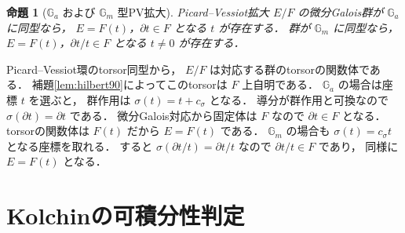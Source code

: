 \documentclass[a5paper,10pt,onecolumn]{jsarticle}
\makeatletter
\theoremstyle{mathnotetheorem}
\newtheorem{proposition}[theorem]{命題}
\renewcommand{\proofname}{証明}
\renewenvironment{proof}[1][\proofname]{%
  \par\pushQED{\qed}\normalfont\topsep4\p@\@plus2\p@\relax
  \trivlist\item[\hskip\labelsep\bfseries #1]\ignorespaces
}{\popQED\endtrivlist\@endpefalse}
\makeatother
\begin{document}
\begin{proposition}[$\mathbb G_a$ および $\mathbb G_m$ 型PV拡大]
\label{prop:one-dim-pv}
Picard--Vessiot拡大 $E/F$ の微分Galois群が
$\mathbb G_a$ に同型なら，
$E=F(t)$，$\partial t\in F$ となる $t$ が存在する．
群が $\mathbb G_m$ に同型なら，
$E=F(t)$，$\partial t/t\in F$ となる
$t\ne0$ が存在する．
\end{proposition}
\begin{proof}
Picard--Vessiot環のtorsor同型から，
$E/F$ は対応する群のtorsorの関数体である．
補題\ref{lem:hilbert90}によってこのtorsorは
$F$ 上自明である．
$\mathbb G_a$ の場合は座標 $t$ を選ぶと，
群作用は $\sigma(t)=t+c_\sigma$ となる．
導分が群作用と可換なので
$\sigma(\partial t)=\partial t$ である．
微分Galois対応から固定体は $F$ なので
$\partial t\in F$ となる．
torsorの関数体は $F(t)$ だから $E=F(t)$ である．
$\mathbb G_m$ の場合も
$\sigma(t)=c_\sigma t$ となる座標を取れる．
すると $\sigma(\partial t/t)=\partial t/t$ なので
$\partial t/t\in F$ であり，
同様に $E=F(t)$ となる．
\end{proof}

\section{Kolchinの可積分性判定}
\end{document}
